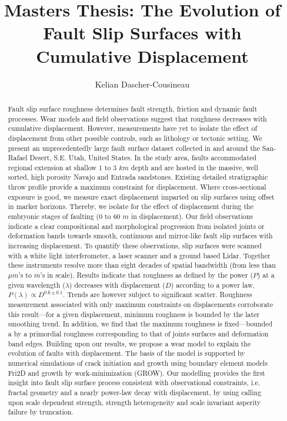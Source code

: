 \documentclass[12pt,a4paper]{article}
\author{Kelian Dascher-Cousineau}
\title{Masters Thesis: The Evolution of Fault Slip Surfaces with Cumulative Displacement}
\begin{document}
\maketitle

\printbibliography

\begin{abstract}

Fault slip surface roughness determines fault strength, friction and dynamic fault processes. Wear models and field observations suggest that roughness decreases with cumulative displacement. However, measurements have yet to isolate the effect of displacement from other possible controls, such as lithology or tectonic setting. We present an unprecedentedly large fault surface dataset collected in and around the San-Rafael Desert, S.E. Utah, United States. In the study area, faults accommodated regional extension at shallow 1 to 3 $km$ depth and are hosted in the massive, well sorted, high porosity Navajo and Entrada sandstones. Existing detailed stratigraphic throw profile provide a maximum constraint for displacement. Where cross-sectional exposure is good, we measure exact displacement imparted on slip surfaces using offset in marker horizons. Thereby, we isolate for the effect of displacement during the embryonic stages of faulting (0 to 60 $m$ in displacement). Our field observations indicate a clear compositional and morphological progression from isolated joints or deformation bands towards smooth, continuous and mirror-like fault slip surfaces with increasing displacement. To quantify these observations, slip surfaces were scanned with a white light interferometer, a laser scanner and a ground based Lidar. Together these instruments resolve more than eight decades of spatial bandwidth (from less than $\mu m$'s to $m$'s in scale). Results indicate that roughness as defined by the power ($P$) at a given wavelength ($\lambda$) decreases with displacement ($D$) according to a power law, $P(\lambda) \varpropto D^{0.6 \pm 0.1}$. Trends are however subject to significant scatter. Roughness measurement associated with only maximum constraints on displacements corroborate this result—for a given displacement, minimum roughness is bounded by the later smoothing trend. In addition, we find that the maximum roughness is fixed—bounded a by a primordial roughness corresponding to that of joints surfaces and deformation band edges. Building upon our results, we propose a wear model to explain the evolution of faults with displacement. The basis of the model is supported by numerical simulations of crack initiation and growth using boundary element models Fri2D and growth by work-minimization (GROW). Our modelling provides the first insight into fault slip surface process consistent with observational constraints, i.e. fractal geometry and a nearly power-law decay with displacement, by using calling upon scale dependent strength, strength heterogeneity and scale invariant asperity failure by truncation.

\end{abstract}
\end{document}
